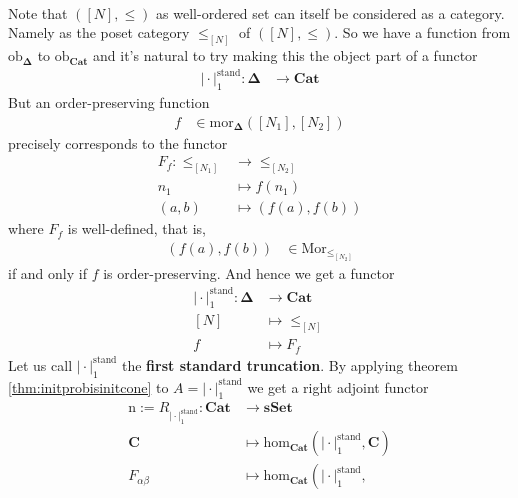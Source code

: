\\
\begin{cst}[Nerve]
\label{cst:nerve}
Note that $([N],\leq)$ as well-ordered set can itself be considered as a category. Namely as the poset category $\pmb{\leq}_{[N]}$ of $([N],\leq)$. So we have a function from $\mathrm{ob}_{\mathbf{\Delta}}$ to $\mathrm{ob}_{\mathbf{Cat}}$ and it's natural to try making this the object part of a functor
\begin{align*}
  \vert
    \cdot
  \vert_{1}^{\textrm{stand}}
  \colon
  \mathbf{\Delta}
  &\rightarrow
  \mathbf{Cat}
\end{align*}
But an order-preserving function
\begin{align*}
  f
  &\in
  \mathrm{mor}_{\mathbf{\Delta}}
  \left(
    [N_{1}],
    [N_{2}]
  \right)
\end{align*}
precisely corresponds to the functor
\begin{align*}
  F_{f}
  \colon
  \pmb{\leq}_{[N_{1}]}
  &\rightarrow
  \pmb{\leq}_{[N_{2}]}
  \\
  n_{1}
  &\mapsto
  f(n_{1})
  \\
  (a,b)
  &\mapsto
  (f(a),f(b))
\end{align*}
where $F_{f}$ is well-defined, that is,
\begin{align*}
  (f(a),f(b))
  &\in
  \mathrm{Mor}_{\pmb{\leq}_{[N_{2}]}}
\end{align*}
if and only if $f$ is order-preserving. And hence we get a functor
\begin{align*}
  \vert
    \cdot
  \vert_{1}^{\textrm{stand}}
  \colon
  \mathbf{\Delta}
  &\rightarrow
  \mathbf{Cat}
  \\
  [N]
  &\mapsto
  \pmb{\leq}_{[N]}
  \\
  f
  &\mapsto
  F_{f}
\end{align*}
Let us call $\vert \cdot \vert_{1}^{\textrm{stand}}$ the \textbf{first standard truncation}. By applying theorem \ref{thm:initprobisinitcone} to $A = \vert \cdot \vert_{1}^{\textrm{stand}}$ we get a right adjoint functor
\begin{align*}
  \mathrm{n}
  :=
  R_{\vert \cdot \vert_{1}^{\textrm{stand}}}
  \colon
  \mathbf{Cat}
  &\rightarrow
  \mathbf{sSet}
  \\
  \mathbf{C}
  &\mapsto
  \mathrm{hom}_{\mathbf{Cat}}
  \left(
    \vert
      \cdot
    \vert_{1}^{\textrm{stand}},
    \mathbf{C}
  \right)
  \\
  F_{\alpha\beta}
  &\mapsto
  \mathrm{hom}_{\mathbf{Cat}}
  \left(
    \vert
      \cdot
    \vert_{1}^{\textrm{stand}},

\end{align*}
\end{cst}
